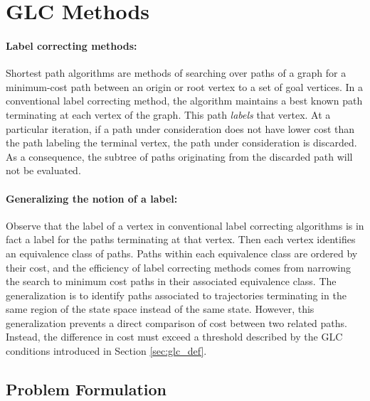 \documentclass{llncs}
\newcommand{\GLC}{\ensuremath{\mathrm{GLC}}\xspace}
\begin{document}
\section{\label{sec:GLC-Methods}GLC Methods}

\paragraph{Label correcting methods:}
Shortest path algorithms are methods of searching over paths of a graph for a minimum-cost path between an origin or root vertex to a set of goal vertices.
% 
In a conventional label correcting method, the algorithm maintains a best known path terminating at each vertex of the graph. This path \textit{labels} that vertex. 
%
At a particular iteration, if a path under consideration does not have lower cost than the path labeling the terminal vertex, the path under consideration is discarded. 
%
As a consequence, the subtree of paths originating from the discarded path will not be evaluated.

%

\paragraph{Generalizing the notion of a label:}
Observe that the label of a vertex in conventional label correcting algorithms is in fact a label for the paths terminating at that vertex.
%
Then each vertex identifies an equivalence class of paths.
% 
Paths within each equivalence class are ordered by their cost, and the efficiency of label correcting methods comes from narrowing the search to minimum cost paths in their associated equivalence class. 
% 
The generalization is to identify paths associated to trajectories terminating in the same region of the state space instead of the same state.
%
However, this generalization prevents a direct comparison of cost between two related paths. 
%
Instead, the difference in cost must exceed a threshold  described by the \GLC conditions introduced in Section \ref{sec:glc_def}. 


\subsection{Problem Formulation}
\end{document}
